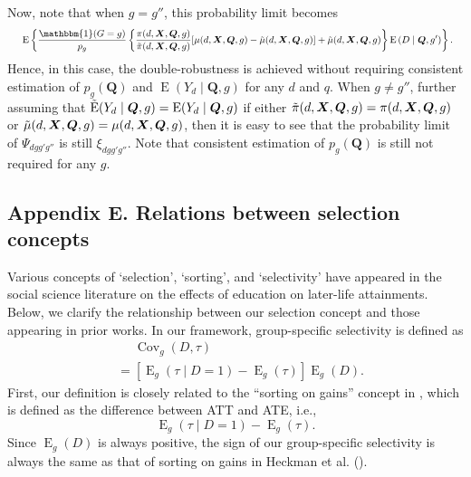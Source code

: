 \documentclass[12pt,a4paper]{article}
\newcommand{\Cov}{\operatorname{Cov}}
\newcommand{\E}{\operatorname{E}}
\def\X{{\boldsymbol X}}
\def\Q{{\boldsymbol Q}}
\def\one{\mathbbm{1}}
\begin{document}
Now, note that when $g=g''$, this probability limit becomes 
\begin{align*}
    &\phantom{{}={}} \E \left\{ \frac{\one(G=g)}{p_{g}} \left\{ \frac{\pi(d,\X,\Q,g)}{\Tilde{\pi}(d,\X,\Q,g)} [\mu(d,\X,\Q,g)-\Tilde{\mu}(d,\X,\Q,g)]+\Tilde{\mu}(d,\X,\Q,g) \right\} \E \left(D \mid \Q,g' \right) \right\}.
\end{align*}
Hence, in this case, the double-robustness is achieved without requiring consistent estimation of $p_g(\Q)$ and $\E(Y_d \mid \Q, g)$ for any $d$ and $q$.
When $g \neq g''$, further assuming that $\Tilde{\E}(Y_d \mid \Q,g)=\E(Y_d \mid \Q,g)$ if either $\Tilde{\pi}(d,\X,\Q,g)=\pi(d,\X,\Q,g)$ or $\Tilde{\mu}(d,\X,\Q,g)=\mu(d,\X,\Q,g)$, then it is easy to see that the probability limit of $\Psi_{dgg'g''}$ is still $\xi_{dgg'g''}$. Note that consistent estimation of $p_g(\Q)$ is still not required for any $g$.

\subsection*{Appendix E. Relations between selection concepts}
Various concepts of `selection', `sorting', and `selectivity' have appeared in the social science literature on the effects of education on later-life attainments. Below, we clarify the relationship between our selection concept and those appearing in prior works. In our framework, group-specific selectivity is defined as 
\begin{align*}
 &\phantom{{}={}} \Cov_g(D,\tau) \\
   &= [\E_g(\tau \mid  D=1)-\E_g(\tau)]\E_g(D).
\end{align*}
First, our definition is closely related to the ``sorting on gains'' concept in \citet{heckman_returns_2018}, which is defined as the difference between ATT and ATE, i.e., 
\begin{equation*}
    \E_g(\tau \mid  D=1)-\E_g(\tau).
\end{equation*}
Since $\E_g(D)$ is always positive, the sign of our group-specific selectivity is always the same as that of sorting on gains in Heckman et al. (\citeyear{heckman_returns_2018}).
\end{document}
